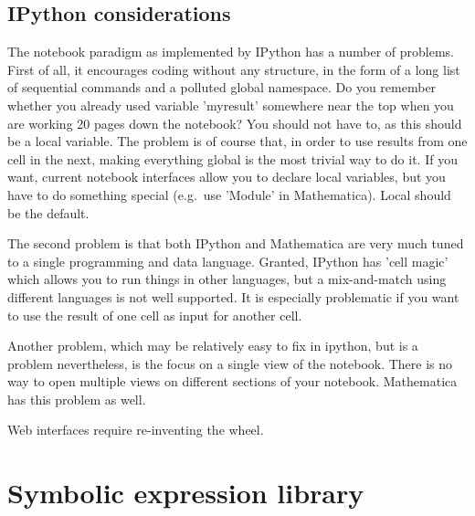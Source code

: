 \documentclass[11pt]{article}
\begin{document}
\subsection{IPython considerations}

The notebook paradigm as implemented by IPython has a number of
problems. First of all, it encourages coding without any structure, in
the form of a long list of sequential commands and a polluted global
namespace. Do you remember whether you already used variable
'myresult' somewhere near the top when you are working 20 pages down
the notebook? You should not have to, as this should be a local
variable. The problem is of course that, in order to use results from
one cell in the next, making everything global is the most trivial way
to do it. If you want, current notebook interfaces allow you to
declare local variables, but you have to do something special
(e.g.~use 'Module' in Mathematica). Local should be the default.

The second problem is that both IPython and Mathematica are very much
tuned to a single programming and data language. Granted, IPython has
'cell magic' which allows you to run things in other languages, but a
mix-and-match using different languages is not well supported. It is
especially problematic if you want to use the result of one cell as
input for another cell.

Another problem, which may be relatively easy to fix in ipython, but
is a problem nevertheless, is the focus on a single view of the
notebook. There is no way to open multiple views on different sections
of your notebook. Mathematica has this problem as well.

Web interfaces require re-inventing the wheel.

% 

\section{Symbolic expression library}
\end{document}
